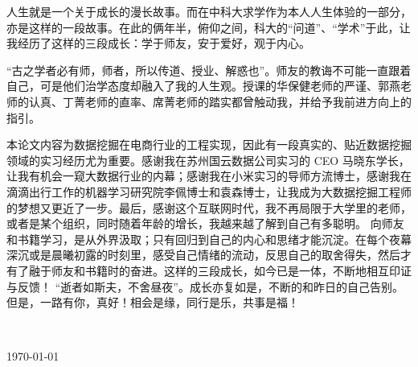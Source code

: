 
\begin{thanks}

人生就是一个关于成长的漫长故事。而在中科大求学作为本人人生体验的一部分，亦是这样的一段故事。在此的俩年半，俯仰之间，科大的“问道”、“学术”于此，让我经历了这样的三段成长：学于师友，安于爱好，观于内心。

“古之学者必有师，师者，所以传道、授业、解惑也”。师友的教诲不可能一直跟着自己，可是他们治学态度却融入了我的人生观。授课的华保健老师的严谨、郭燕老师的认真、丁菁老师的直率、席菁老师的踏实都曾触动我，并给予我前进方向上的指引。

本论文内容为数据挖掘在电商行业的工程实现，因此有一段真实的、贴近数据挖掘领域的实习经历尤为重要。感谢我在苏州国云数据公司实习的 CEO 马晓东学长，让我有机会一窥大数据行业的内幕；感谢我在小米实习的导师方流博士，感谢我在滴滴出行工作的机器学习研究院李佩博士和袁森博士，让我成为大数据挖掘工程师的梦想又更近了一步。最后，感谢这个互联网时代，我不再局限于大学里的老师，或者是某个组织，同时随着年龄的增长，我越来越了解到自己有多聪明。
向师友和书籍学习，是从外界汲取；只有回归到自己的内心和思绪才能沉淀。在每个夜幕深沉或是晨曦初露的时刻里，感受自己情绪的流动，反思自己的取舍得失，然后才有了融于师友和书籍时的奋进。这样的三段成长，如今已是一体，不断地相互印证与反馈！
“逝者如斯夫，不舍昼夜”。成长亦复如是，不断的和昨日的自己告别。但是，一路有你，真好！相会是缘，同行是乐，共事是福！

\vskip 18pt

\begin{flushright}

~~~~\ustc@author~~~~

\today

\end{flushright}

\end{thanks}
